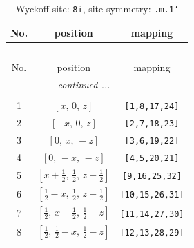 \documentclass[fleqn,8pt]{jsarticle}
\begin{document}
\begin{longtable}{ccc}
\caption{Wyckoff site: {\tt 8i}, site symmetry: {\tt .m.1'}}
 \\
 \hline \hline
No. & position & mapping \\ \hline \endfirsthead

\multicolumn{2}{l}{\tablename\ \thetable{}} \\
 \hline \hline
No. & position & mapping \\ \hline \endhead

 \hline \hline
\multicolumn{2}{r}{\footnotesize\it continued ...} \\ \endfoot

 \hline \hline
\multicolumn{2}{r}{} \\ \endlastfoot

1 & $\left[ x,\, 0,\, z \right]$ & {\tt [1,8,17,24]} \\ \hline
2 & $\left[ - x,\, 0,\, z \right]$ & {\tt [2,7,18,23]} \\ \hline
3 & $\left[ 0,\, x,\, - z \right]$ & {\tt [3,6,19,22]} \\ \hline
4 & $\left[ 0,\, - x,\, - z \right]$ & {\tt [4,5,20,21]} \\ \hline
5 & $\left[ x + \frac{1}{2},\, \frac{1}{2},\, z + \frac{1}{2} \right]$ & {\tt [9,16,25,32]} \\ \hline
6 & $\left[ \frac{1}{2} - x,\, \frac{1}{2},\, z + \frac{1}{2} \right]$ & {\tt [10,15,26,31]} \\ \hline
7 & $\left[ \frac{1}{2},\, x + \frac{1}{2},\, \frac{1}{2} - z \right]$ & {\tt [11,14,27,30]} \\ \hline
8 & $\left[ \frac{1}{2},\, \frac{1}{2} - x,\, \frac{1}{2} - z \right]$ & {\tt [12,13,28,29]} \\
\end{longtable}
\renewcommand{\arraystretch}{1.2}
\end{document}
